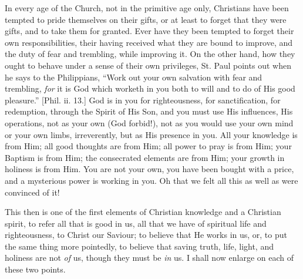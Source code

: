 In every age of the Church, not in the primitive age only,
Christians have been tempted to pride themselves on their gifts, or at
least to forget that they were gifts, and to take them for granted.
Ever have they been tempted to forget their own responsibilities,
their having received what they are bound to improve, and the duty of
fear and trembling, while improving it. On the other hand, how they
ought to behave under a sense of their own privileges, St. Paul points
out when he says to the Philippians, ``Work out your own salvation
with fear and trembling, \emph{for} it is God which worketh in you both to
will and to do of His good pleasure.'' [Phil. ii. 13.] God is in
you for righteousness, for sanctification, for redemption, through the
Spirit of His Son, and you must use His influences, His operations,
not as your own (God forbid!), not as you would use your own mind or
your own limbs, irreverently, but as His presence in you. All your
knowledge is from Him; all good thoughts are from Him; all power to
pray is from Him; your Baptism is from Him; the consecrated elements
are from Him; your growth in holiness is from Him. You are not your
own, you have been bought with a price, and a mysterious power is
working in you. Oh that we felt all this as well as were convinced of
it!

This then is one of the first elements of Christian knowledge and a
Christian spirit, to refer all that is good in us, all that we have of
spiritual life and righteousness, to Christ our Saviour; to believe
that He works in us, or, to put the same thing more pointedly, to
believe that saving truth, life, light, and holiness are not \emph{of}
us, though they must be \emph{in} us. I shall now enlarge on each of
these two points.

